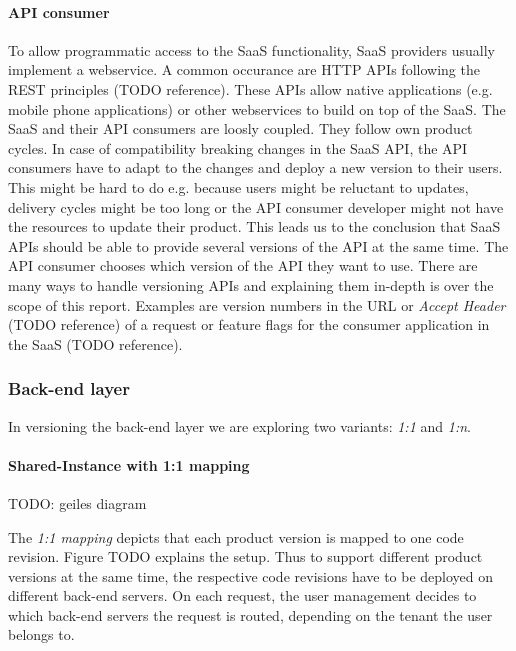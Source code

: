 \paragraph{API consumer} To allow programmatic access to the SaaS functionality, SaaS providers usually implement a webservice. A common occurance are HTTP APIs following the REST principles (TODO reference). These APIs allow native applications (e.g. mobile phone applications) or other webservices to build on top of the SaaS. The SaaS and their API consumers are loosly coupled. They follow own product cycles. In case of compatibility breaking changes in the SaaS API, the API consumers have to adapt to the changes and deploy a new version to their users. This might be hard to do e.g. because users might be reluctant to updates, delivery cycles might be too long or the API consumer developer might not have the resources to update their product. This leads us to the conclusion that SaaS APIs should be able to provide several versions of the API at the same time. The API consumer chooses which version of the API they want to use. There are many ways to handle versioning APIs and explaining them in-depth is over the scope of this report. Examples are version numbers in the URL or \emph{Accept Header} (TODO reference) of a request or feature flags for the consumer application in the SaaS (TODO reference).


\subsubsection{Back-end layer}

In versioning the back-end layer we are exploring two variants: \emph{1:1} and \emph{1:n}.

\paragraph{Shared-Instance with 1:1 mapping}
TODO: geiles diagram

The \emph{1:1 mapping} depicts that each product version is mapped to one code revision. Figure TODO explains the setup. Thus to support different product versions at the same time, the respective code revisions have to be deployed on different back-end servers. On each request, the user management decides to which back-end servers the request is routed, depending on the tenant the user belongs to.

